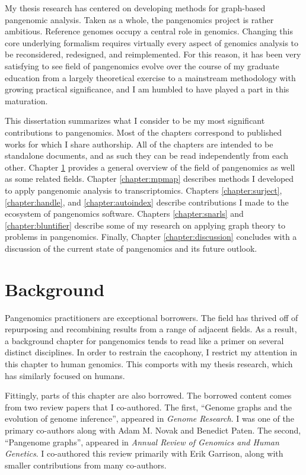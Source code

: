 \documentclass[11pt]{ucthesis}
\begin{document}
My thesis research has centered on developing methods for graph-based pangenomic analysis. Taken as a whole, the pangenomics project is rather ambitious. Reference genomes occupy a central role in genomics. Changing this core underlying formalism requires virtually every aspect of genomics analysis to be reconsidered, redesigned, and reimplemented. For this reason, it has been very satisfying to see field of pangenomics evolve over the course of my graduate education from a largely theoretical exercise to a mainstream methodology with growing practical significance, and I am humbled to have played a part in this maturation.

This dissertation summarizes what I consider to be my most significant contributions to pangenomics. Most of the chapters correspond to published works for which I share authorship. All of the chapters are intended to be standalone documents, and as such they can be read independently from each other. Chapter \ref{chapter:background} provides a general overview of the field of pangenomics as well as some related fields. Chapter \ref{chapter:mpmap} describes methods I developed to apply pangenomic analysis to transcriptomics. Chapters \ref{chapter:surject}, \ref{chapter:handle}, and \ref{chapter:autoindex} describe contributions I made to the ecosystem of pangenomics software. Chapters \ref{chapter:snarls} and \ref{chapter:bluntifier} describe some of my research on applying graph theory to problems in pangenomics. Finally, Chapter \ref{chapter:discussion} concludes with a discussion of the current state of pangenomics and its future outlook.

\chapter{Background}

\label{chapter:background}

Pangenomics practitioners are exceptional borrowers. The field has thrived off of repurposing and recombining results from a range of adjacent fields. As a result, a background chapter for pangenomics tends to read like a primer on several distinct disciplines. In order to restrain the cacophony, I restrict my attention in this chapter to human genomics. This comports with my thesis research, which has similarly focused on humans. 

Fittingly, parts of this chapter are also borrowed. The borrowed content comes from two review papers that I co-authored. The first, ``Genome graphs and the evolution of genome inference'', appeared in \emph{Genome Research}. I was one of the primary co-authors along with Adam M. Novak and Benedict Paten\cite{paten2017genome}. The second, ``Pangenome graphs'', appeared in \emph{Annual Review of Genomics and Human Genetics}. I co-authored this review primarily with Erik Garrison, along with smaller contributions from many co-authors\cite{eizenga2020pangenome}.
\end{document}
